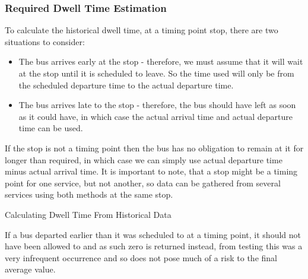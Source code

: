 \documentclass{article}
\begin{document}
\subsubsection{Required Dwell Time Estimation}
\par
To calculate the historical dwell time, at a timing point stop, there are two situations to consider:
\begin{itemize}
	\item The bus arrives early at the stop - therefore,  we must assume that it will wait at the stop until it is scheduled to leave. So the time used will only be from the scheduled departure time to the actual departure time.
	\item The bus arrives late to the stop - therefore, the bus should have left as soon as it could have, in which case the actual arrival time and actual departure time can be used. 
\end{itemize}

\par
If the stop is not a timing point then the bus has no obligation to remain at it for longer than required, in which case we can simply use actual departure time minus actual arrival time. It is important to note, that a stop might be a timing point for one service, but not another, so data can be gathered from several services using both methods at the same stop.


\begin{algorithm}[H]
	\label{dwellAlgorihtm}
	\SetAlgoLined


	
	
	\caption{Calculating Dwell Time From Historical Data }
\end{algorithm}

If a bus departed earlier than it was scheduled to at a timing point, it should not have been allowed to and as such zero is returned instead, from testing this was a very infrequent occurrence and so does not pose much of a risk to the final average value.  
\end{document}
